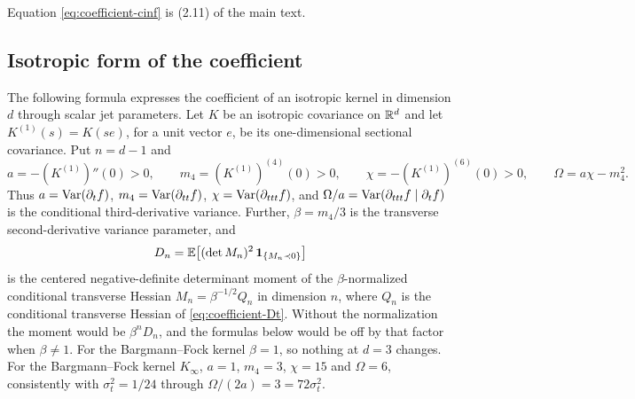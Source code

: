 Equation \eqref{eq:coefficient-cinf} is (2.11) of the main text.

\subsection{Isotropic form of the coefficient}\label{ssec:coefficient-isotropic}

The following formula expresses the coefficient of an isotropic kernel in dimension $d$ through scalar jet parameters. Let $K$ be an isotropic covariance on $\mathbb R^d$ and let $K^{(1)}(s)=K(se)$, for a unit vector $e$, be its one-dimensional sectional covariance. Put $n=d-1$ and
\begin{equation}\label{eq:coefficient-symbols}
a=-(K^{(1)})''(0)>0,\qquad m_4=(K^{(1)})^{(4)}(0)>0,\qquad \chi=-(K^{(1)})^{(6)}(0)>0,\qquad \Omega=a\chi-m_4^2 .
\end{equation}
Thus $a=\operatorname{Var}(\partial_tf)$, $m_4=\operatorname{Var}(\partial_{tt}f)$, $\chi=\operatorname{Var}(\partial_{ttt}f)$, and $\Omega/a=\operatorname{Var}(\partial_{ttt}f\mid\partial_tf)$ is the conditional third-derivative variance. Further, $\beta=m_4/3$ is the transverse second-derivative variance parameter, and
\begin{equation}\label{eq:coefficient-Dn}
D_n=\mathbb E\bigl[(\det M_n)^2\,\mathbf 1_{\{M_n\prec0\}}\bigr]
\end{equation}
is the centered negative-definite determinant moment of the $\beta$-normalized conditional transverse Hessian $M_n=\beta^{-1/2}Q_n$ in dimension $n$, where $Q_n$ is the conditional transverse Hessian of \eqref{eq:coefficient-Dt}. Without the normalization the moment would be $\beta^nD_n$, and the formulas below would be off by that factor when $\beta\ne1$. For the Bargmann--Fock kernel $\beta=1$, so nothing at $d=3$ changes. For the Bargmann--Fock kernel $K_\infty$, $a=1$, $m_4=3$, $\chi=15$ and $\Omega=6$, consistently with $\sigma_t^2=1/24$ through $\Omega/(2a)=3=72\sigma_t^2$.

